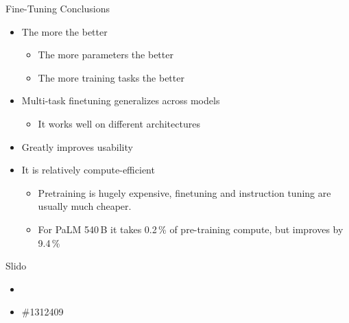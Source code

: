 \begin{vbframe}{Fine-Tuning Conclusions}

\vfill

\begin{itemize}
\item The  more the better
    \begin{itemize}
    \item The more parameters the better
    \item The more training tasks the better
    \end{itemize}
\item Multi-task finetuning generalizes across models
    \begin{itemize}
    \item It works well on different architectures
    \end{itemize}
\item Greatly improves usability
\item It is relatively compute-efficient
    \begin{itemize}
    \item Pretraining is hugely expensive, finetuning and
    instruction tuning are usually much cheaper.
    \item For PaLM 540\,B it takes 0.2\,\% of pre-training compute, but improves by 9.4\,\%
    \end{itemize}
\end{itemize}

\vfill

\end{vbframe}

\begin{vbframe}{Slido}

\vfill

\begin{itemize}
		\item \href{https://app.sli.do/event/egqn27QqTsvFUZPeQvZtVU}{}

\item \#1312409
\end{itemize}

\vfill

\end{vbframe}



